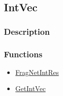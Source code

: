 \subsection{IntVec}\label{IntVec}
\subsubsection{Description}


\subsubsection{Functions}
\begin{itemize}
\item \hyperref[FragNetIntRes]{FragNetIntRes}
\item \hyperref[GetIntVec]{GetIntVec}
\end{itemize}

